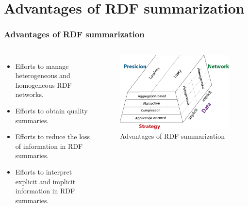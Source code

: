 \documentclass{beamer}
\numberwithin{figure}{section}
\numberwithin{equation}{section}
\begin{document}
\section{Advantages of RDF summarization}
\begin{frame} \scriptsize
 \frametitle{Advantages of RDF summarization}
  \begin{columns}[c] 
 		\begin{itemize} \justifying
        	
  			\item Efforts to manage heterogeneous and homogeneous RDF networks\cite{Aufaure2012}.
      		\vspace{2mm}
  			\item Efforts to obtain quality summaries\cite{Khatchadourian2010}.
      		\vspace{2mm}
    		\item Efforts to reduce the loss of information in RDF summaries.
      		\vspace{2mm}
    		\item Efforts to interpret explicit and implicit information in RDF summaries\cite{Ristoski}.
  		\end{itemize}

 		\begin{figure}[p]
  		\centering
  		\includegraphics[width=1.0\linewidth]{pictures/strategyRDF}
  		\caption{\scriptsize Advantages of RDF summarization}
  		\label{fig:approaches_RDF}
 	\end{figure}
        
        
 \end{columns}
 

\end{frame}
\end{document}
